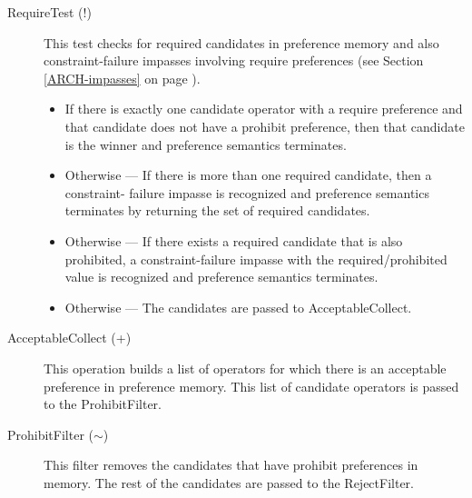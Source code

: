 \begin{description}
\item[RequireTest (!)]
This test checks for required candidates in preference memory and
also constraint-failure impasses involving require preferences (see
Section \ref{ARCH-impasses} on page \pageref{ARCH-impasses}).

\begin{itemize}
\item If there is exactly one candidate operator with a require preference and
	that candidate does not have a prohibit preference, then that candidate
	is the winner and preference semantics terminates.
\item Otherwise ---
	If there is more than one required candidate, then a constraint-
	failure impasse is recognized and preference semantics terminates 
	by returning the set of required candidates.
\item Otherwise ---
	If there exists a required candidate that is also prohibited, a
	constraint-failure impasse with the required/prohibited value is
	recognized and preference semantics terminates.
\item Otherwise ---
	The candidates are passed to AcceptableCollect.
\end{itemize}

\item[AcceptableCollect (+) ] This operation builds a list of operators
	for which there is an acceptable preference in preference memory.
	This list of candidate operators is passed to the ProhibitFilter.\index{+}


\item[ProhibitFilter ($\sim$) ] This filter removes the candidates that
	have prohibit preferences in memory. The rest of the candidates are passed to
	the RejectFilter.
\index{~}


\end{description}
